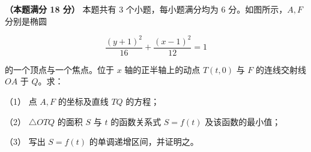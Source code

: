 \begin{question}
\textbf{（本题满分 18 分）} 本题共有 3 个小题，每小题满分均为 6 分。如图所示，$A,F$ 分别是椭圆

\nopagebreak[4]
\[
\frac{(y+1)^2}{16}+\frac{(x-1)^2}{12}=1
\]

的一个顶点与一个焦点。位于 $x$ 轴的正半轴上的动点 $T(t,0)$ 与 $F$ 的连线交射线 $OA$ 于 $Q$。求：
\nopagebreak[4]
\begin{center}\end{center}
\nopagebreak[4]
（1） 点 $A,F$ 的坐标及直线 $TQ$ 的方程；

（2） $\triangle OTQ$ 的面积 $S$ 与 $t$ 的函数关系式 $S=f(t)$ 及该函数的最小值；

（3） 写出 $S=f(t)$ 的单调递增区间，并证明之。

\end{question}